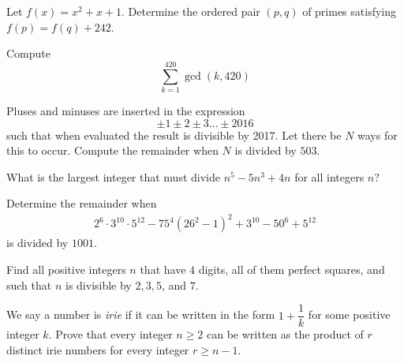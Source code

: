 \documentclass[problems.tex]{subfile}
\begin{document}
	\begin{problem}
		Let $f(x) = x^2 + x + 1$. Determine the ordered pair $(p,q)$ of primes satisfying $f(p) = f(q) + 242$. %
	\end{problem}

	\begin{problem}
		Compute \[\sum_{k=1}^{420} \gcd(k,420)\]
	\end{problem}

	\begin{problem}
		Pluses and minuses are inserted in the expression \[\pm 1 \pm 2 \pm 3 \dots \pm 2016\]such that when evaluated the result is divisible by 2017. Let there be $N$ ways for this to occur. Compute the remainder when $N$ is divided by $503$. %
	\end{problem}

	\begin{problem}
		What is the largest integer that must divide $n^5-5n^3+4n$ for all integers $n$? %
	\end{problem}

	\begin{problem}
		Determine the remainder when
			\begin{align*}
				2^6\cdot3^{10}\cdot5^{12}-75^4\left(26^2-1\right)^2+3^{10}-50^6+5^{12}
			\end{align*}
		is divided by $1001$. %
	\end{problem}

	\begin{problem}[CentroAmerican 2016]
		Find all positive integers $n$ that have $4$ digits, all of them perfect squares, and such that $n$ is divisible by $2, 3, 5$, and $7$. %
	\end{problem}

	\begin{problem}[CentroAmerican 2016]
		We say a number is \textit{irie} if it can be written in the form $1+\dfrac{1}{k}$ for some positive integer $k$. Prove that every integer $n \geq 2$ can be written as the product of $r$ distinct irie numbers for every integer $r \geq n-1$. %
	\end{problem}
\end{document}
